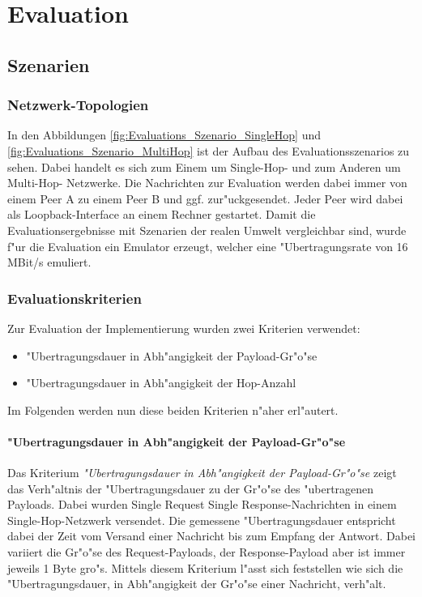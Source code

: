 \chapter{Evaluation}
\label{cha:evaluation}

\section{Szenarien}

\subsection{Netzwerk-Topologien}
In den Abbildungen \ref{fig:Evaluations_Szenario_SingleHop} und \ref{fig:Evaluations_Szenario_MultiHop} ist der Aufbau des Evaluationsszenarios zu sehen. Dabei handelt es sich zum Einem um Single-Hop- und zum Anderen um Multi-Hop- Netzwerke. Die Nachrichten zur Evaluation werden dabei immer von einem Peer A zu einem Peer B und ggf. zur"uckgesendet. Jeder Peer wird dabei als Loopback-Interface an einem Rechner gestartet. Damit die Evaluationsergebnisse mit Szenarien der realen Umwelt vergleichbar sind, wurde f"ur die Evaluation ein Emulator erzeugt, welcher eine "Ubertragungsrate von 16 MBit/s emuliert.

\subsection{Evaluationskriterien}
Zur Evaluation der Implementierung wurden zwei Kriterien verwendet:
\begin{itemize}
\item "Ubertragungsdauer in Abh"angigkeit der Payload-Gr"o"se
\item "Ubertragungsdauer in Abh"angigkeit der Hop-Anzahl
\end{itemize}
Im Folgenden werden nun diese beiden Kriterien n"aher erl"autert.

\subsubsection{"Ubertragungsdauer in Abh"angigkeit der Payload-Gr"o"se}
Das Kriterium \emph{"Ubertragungsdauer in Abh"angigkeit der Payload-Gr"o"se} zeigt das Verh"altnis der "Ubertragungsdauer zu der Gr"o"se des "ubertragenen Payloads. Dabei wurden Single Request Single Response-Nachrichten in einem Single-Hop-Netzwerk versendet. Die gemessene "Ubertragungsdauer entspricht dabei der Zeit vom Versand einer Nachricht bis zum Empfang der Antwort. Dabei variiert die Gr"o"se des Request-Payloads, der Response-Payload aber ist immer jeweils 1 Byte gro"s. Mittels diesem Kriterium l"asst sich feststellen wie sich die "Ubertragungsdauer, in Abh"angigkeit der Gr"o"se einer Nachricht, verh"alt.

